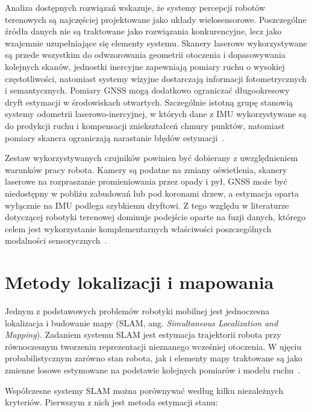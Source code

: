 \documentclass[a4paper,twoside,12pt]{book}
\begin{document}
Analiza dostępnych rozwiązań wskazuje, że systemy percepcji robotów terenowych są najczęściej projektowane jako układy wielosensorowe. Poszczególne źródła danych nie są traktowane jako rozwiązania konkurencyjne, lecz jako wzajemnie uzupełniające się elementy systemu. Skanery laserowe wykorzystywane są przede wszystkim do odwzorowania geometrii otoczenia i dopasowywania kolejnych skanów, jednostki inercyjne zapewniają pomiary ruchu o wysokiej częstotliwości, natomiast systemy wizyjne dostarczają informacji fotometrycznych i semantycznych. Pomiary GNSS mogą dodatkowo ograniczać długookresowy dryft estymacji w środowiskach otwartych. Szczególnie istotną grupę stanowią systemy odometrii laserowo-inercyjnej, w których dane z IMU wykorzystywane są do predykcji ruchu i kompensacji zniekształceń chmury punktów, natomiast pomiary skanera ograniczają narastanie błędów estymacji~\cite{Xu2020FASTLIOAF}.

Zestaw wykorzystywanych czujników powinien być dobierany z uwzględnieniem warunków pracy robota. Kamery są podatne na zmiany oświetlenia, skanery laserowe na rozpraszanie promieniowania przez opady i pył, GNSS może być niedostępny w pobliżu zabudowań lub pod koronami drzew, a estymacja oparta wyłącznie na IMU podlega szybkiemu dryftowi. Z tego względu w literaturze dotyczącej robotyki terenowej dominuje podejście oparte na fuzji danych, którego celem jest wykorzystanie komplementarnych właściwości poszczególnych modalności sensorycznych~\cite{Wei2025FusionPortableV2,Zhang2023AdverseWeather,Beuchert2023RawGNSSFusion}.

\section{Metody lokalizacji i mapowania}

Jednym z podstawowych problemów robotyki mobilnej jest jednoczesna lokalizacja i budowanie mapy (SLAM, ang. \textit{Simultaneous Localization and Mapping}). Zadaniem systemu SLAM jest estymacja trajektorii robota przy równoczesnym tworzeniu reprezentacji nieznanego wcześniej otoczenia. W ujęciu probabilistycznym zarówno stan robota, jak i elementy mapy traktowane są jako zmienne losowe estymowane na podstawie kolejnych pomiarów i modelu ruchu~\cite{SLAM_article}.

Współczesne systemy SLAM można porównywać według kilku niezależnych kryteriów. Pierwszym z nich jest metoda estymacji stanu:
\end{document}
